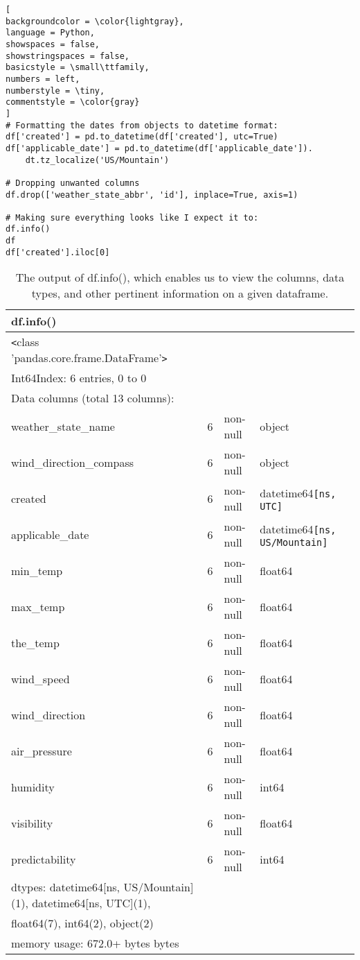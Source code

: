 \documentclass[]{article}
\begin{document}
\begin{lstlisting}[
backgroundcolor = \color{lightgray},
language = Python,
showspaces = false,
showstringspaces = false,
basicstyle = \small\ttfamily,
numbers = left,
numberstyle = \tiny,
commentstyle = \color{gray}
]
# Formatting the dates from objects to datetime format:
df['created'] = pd.to_datetime(df['created'], utc=True)
df['applicable_date'] = pd.to_datetime(df['applicable_date']).
	dt.tz_localize('US/Mountain')

# Dropping unwanted columns
df.drop(['weather_state_abbr', 'id'], inplace=True, axis=1)

# Making sure everything looks like I expect it to:
df.info()
df
df['created'].iloc[0]
\end{lstlisting}

\begin{table}[!ht]
	\begin{center}
		\caption{The output of df.info(), which enables us to view the columns, data types, and other pertinent information on a given dataframe.}
		\label{tab:table1}
		\begin{tabular}{|l|lll|} 
			\hline
			\textbf{df.info()} &&&\\
			\hline
			\verb|<|class 'pandas.core.frame.DataFrame'\verb|>|&&&\\
			Int64Index: 6 entries, 0 to 0&&&\\
			Data columns (total 13 columns):&&&\\
			weather\_state\_name     &   6 &non-null &object\\
			wind\_direction\_compass  &  6& non-null &object\\
			created                 &  6& non-null& datetime64\verb|[ns, UTC]|\\
			applicable\_date         &  6& non-null& datetime64\verb|[ns, US/Mountain]|\\
			min\_temp                &  6& non-null &float64\\
			max\_temp               &   6 &non-null &float64\\
			the\_temp               &   6& non-null& float64\\
			wind\_speed              &  6& non-null &float64\\
			wind\_direction          &  6& non-null &float64\\
			air\_pressure           &   6 &non-null& float64\\
			humidity                &  6 &non-null &int64\\
			visibility              &  6& non-null& float64\\
			predictability          &  6& non-null& int64\\
			dtypes: datetime64[ns, US/Mountain](1), datetime64[ns, UTC](1), &&&\\
			float64(7), int64(2), object(2)&&&\\
			memory usage: 672.0+ bytes bytes&&&\\
			\hline
		\end{tabular}
	\end{center}
\end{table}
\end{document}
